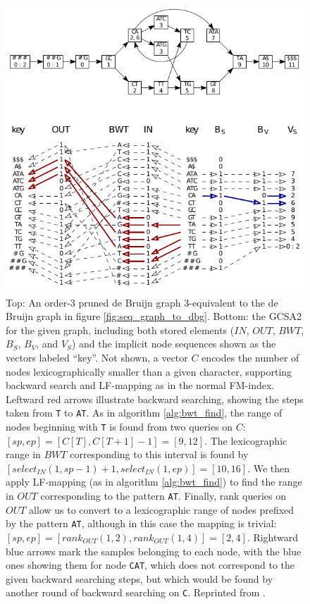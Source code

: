 \begin{figure}[htbp!]
  \includegraphics[width=\textwidth]{Chapter2/Figs/DBG_to_GCSA.pdf}
  \caption[Searching in the {\tt GCSA2}]{
    Top: An order-3 pruned de Bruijn graph 3-equivalent to the de Bruijn graph in figure \ref{fig:seq_graph_to_dbg}.
    Bottom: the GCSA2 for the given graph, including both stored elements ($IN$, $OUT$, $BWT$, $B_S$, $B_V$, and $V_S$) and the implicit node sequences shown as the vectors labeled ``key''.
    Not shown, a vector $C$ encodes the number of nodes lexicographically smaller than a given character, supporting backward search and LF-mapping as in the normal FM-index.
    Leftward red arrows illustrate backward searching, showing the steps taken from {\tt T} to {\tt AT}.
    As in algorithm \ref{alg:bwt_find}, the range of nodes beginning with {\tt T} is found from two queries on $C$: $[sp, ep] = [C[T], C[T+1]-1] = [9,12]$.
    The lexicographic range in $BWT$ corresponding to this interval is found by $[select_{IN}(1, sp-1)+1, select_{IN}(1, ep)] = [10,16]$.
    We then apply LF-mapping (as in algorithm \ref{alg:bwt_find}) to find the range in $OUT$ corresponding to the pattern {\tt AT}.
    Finally, rank queries on $OUT$ allow us to convert to a lexicographic range of nodes prefixed by the pattern {\tt AT}, although in this case the mapping is trivial: $[sp,ep] = [rank_{OUT}(1,2),rank_{OUT}(1,4)] = [2,4]$.
    Rightward blue arrows mark the samples belonging to each node, with the blue ones showing them for node {\tt CAT}, which does not correspond to the given backward searching steps, but which would be found by another round of backward searching on {\tt C}.
    Reprinted from \cite{siren2017indexing}.
  }
  \label{fig:gcsa2_search}
\end{figure}

